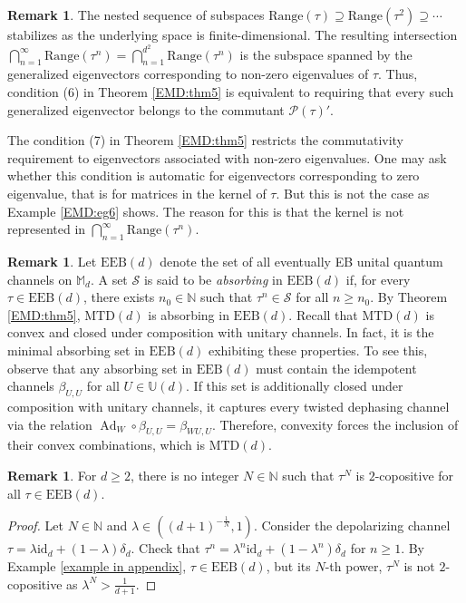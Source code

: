 \documentclass[11pt,reqno]{amsart}
\theoremstyle{definition}
\newtheorem{rmk}[defn]{Remark}
\theoremstyle{plain}
\theoremstyle{remark}
\numberwithin{equation}{section}%
\begin{document}
\begin{rmk}
    The nested sequence of subspaces $\text{Range}(\tau) \supseteq \text{Range}(\tau^2) \supseteq \cdots$ stabilizes as the underlying space is finite-dimensional. The resulting intersection $\bigcap_{n=1}^\infty \text{Range}(\tau^n)= \bigcap _{n=1}^{d^2}\text{Range}(\tau ^n)$ is the subspace spanned by the generalized eigenvectors corresponding to non-zero eigenvalues of $\tau$. Thus, condition (6) in Theorem \ref{EMD:thm5} is equivalent to requiring that every such generalized eigenvector belongs to the commutant $\mathcal{P}(\tau)'$.

 The   condition (7) in  Theorem \ref{EMD:thm5} restricts the commutativity requirement to eigenvectors associated with non-zero eigenvalues. One may ask whether this condition is automatic  for eigenvectors corresponding to zero eigenvalue, that is for matrices in the kernel of $\tau $. But this is not the case as Example \ref{EMD:eg6} shows. The reason for this is that the kernel is not represented in $\bigcap_{n=1}^\infty \text{Range}(\tau^n).$
\end{rmk}


\begin{rmk}
Let $\mathrm{EEB}(d)$ denote the set of all eventually EB unital quantum channels on $\mathbb{M}_d$. A set $\mathcal{S}$ is said to be \textit{absorbing } in $\mathrm{EEB}(d)$ if, for every $\tau\in\mathrm{EEB}(d)$, there exists $n_0\in\mathbb{N}$ such that $\tau^n\in\mathcal{S}$ for all $n\geq n_0$. By Theorem \ref{EMD:thm5}, $\mathrm{MTD}(d)$ is absorbing in $\mathrm{EEB}(d)$. Recall that $\mathrm{MTD}(d)$ is convex and closed under composition with unitary channels. In fact, it is the minimal absorbing set in $\mathrm{EEB}(d)$ exhibiting these properties. To see this, observe that any absorbing set in $\mathrm{EEB}(d)$ must contain the idempotent channels $\beta_{U,U}$ for all $U \in \mathbb{U}(d)$. If this set is additionally closed under composition with unitary channels, it captures every twisted dephasing channel via the relation $\operatorname{Ad}_W \circ \beta_{U,U} = \beta_{WU,U}$. Therefore, convexity forces the inclusion of their convex combinations, which is $\mathrm{MTD}(d)$.
\end{rmk}

\begin{rmk}\label{universal bound}
      For $d \ge 2$, there is no integer $N\in\mathbb{N}$ such that $\tau^N$ is $2$-copositive for all $\tau\in\mathrm{EEB}(d)$.
      \begin{proof}
          Let $N\in\mathbb{N}$ and $\lambda\in((d+1)^{-\frac{1}{N}},1)$. Consider the depolarizing channel $\tau=\lambda\text{id}_d+(1-\lambda)\delta_d$. Check that $\tau^n=\lambda^n\text{id}_d+(1-\lambda^n)\delta_d$ for $n\geq 1$. By Example \ref{example in appendix}, $\tau\in\mathrm{EEB}(d)$, but its $N$-th power, $\tau^N$ is not $2$-copositive as $\lambda^N>\frac{1}{d+1}$.
      \end{proof}
  \end{rmk}
\end{document}

